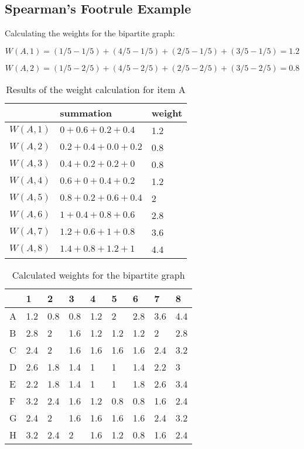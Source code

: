 \subsection*{Spearman's Footrule Example}

Calculating the weights for the bipartite graph:

\begin{equation}
W(A,1) = (1/5 - 1/5) + (4/5 - 1/5) + (2/5 - 1/5) + (3/5 - 1/5) = 1.2
\end{equation}

\begin{equation}
W(A,2) = (1/5 - 2/5) + (4/5 - 2/5) + (2/5 - 2/5) + (3/5 - 2/5) = 0.8
\end{equation}

\begin{table}[h]
\begin{tabular}{|l|l|l|}\hline
         & summation         & weight \\\hline
$W(A,1)$ & $0+0.6+0.2+0.4$   & 1.2    \\
$W(A,2)$ & $0.2+0.4+0.0+0.2$ & 0.8    \\
$W(A,3)$ & $0.4+0.2+0.2+0$   & 0.8    \\
$W(A,4)$ & $0.6+0+0.4+0.2$   & 1.2    \\
$W(A,5)$ & $0.8+0.2+0.6+0.4$ & 2      \\
$W(A,6)$ & $1+0.4+0.8+0.6$   & 2.8    \\
$W(A,7)$ & $1.2+0.6+1+0.8$   & 3.6    \\
$W(A,8)$ & $1.4+0.8+1.2+1$   & 4.4    \\\hline
\end{tabular}
\caption{Results of the weight calculation for item A}
\end{table}

\begin{table}[h]
\begin{tabular}{|l|llllllll|}\hline
  & 1   & 2   & 3   & 4   & 5   & 6   & 7   & 8   \\\hline
A & 1.2 & 0.8 & 0.8 & 1.2 & 2   & 2.8 & 3.6 & 4.4 \\
B & 2.8 & 2   & 1.6 & 1.2 & 1.2 & 1.2 & 2   & 2.8 \\
C & 2.4 & 2   & 1.6 & 1.6 & 1.6 & 1.6 & 2.4 & 3.2 \\
D & 2.6 & 1.8 & 1.4 & 1   & 1   & 1.4 & 2.2 & 3   \\
E & 2.2 & 1.8 & 1.4 & 1   & 1   & 1.8 & 2.6 & 3.4 \\
F & 3.2 & 2.4 & 1.6 & 1.2 & 0.8 & 0.8 & 1.6 & 2.4 \\
G & 2.4 & 2   & 1.6 & 1.6 & 1.6 & 1.6 & 2.4 & 3.2 \\
H & 3.2 & 2.4 & 2   & 1.6 & 1.2 & 0.8 & 1.6 & 2.4 \\\hline
\end{tabular}
\caption{Calculated weights for the bipartite graph}
\end{table}

